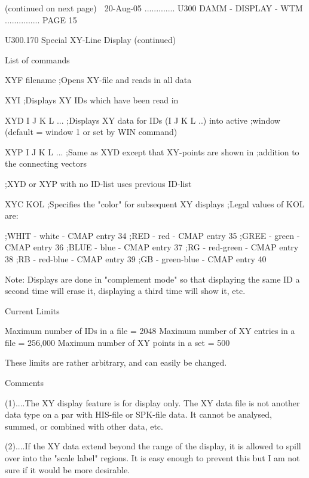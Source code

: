  
 
                            (continued on next page)
    
   20-Aug-05 ............. U300  DAMM - DISPLAY - WTM ............... PAGE  15
 
 
   U300.170  Special XY-Line Display (continued)
 
   List of commands
 
   XYF  filename     ;Opens XY-file and reads in all data
 
   XYI               ;Displays XY IDs which have been read in
 
   XYD  I J K L ...  ;Displays XY data for IDs (I J K L ..) into active
                     ;window (default = window 1 or set by WIN command)
 
   XYP  I J K L ...  ;Same as XYD except that XY-points are shown in
                     ;addition to the connecting vectors
 
                     ;XYD or XYP with no ID-list uses previous ID-list
 
   XYC  KOL          ;Specifies the "color" for subsequent XY displays
                     ;Legal values of KOL are:
 
                     ;WHIT - white      - CMAP entry 34
                     ;RED  - red        - CMAP entry 35
                     ;GREE - green      - CMAP entry 36
                     ;BLUE - blue       - CMAP entry 37
                     ;RG   - red-green  - CMAP entry 38
                     ;RB   - red-blue   - CMAP entry 39
                     ;GB   - green-blue - CMAP entry 40
 
   Note:  Displays  are  done in "complement mode" so that displaying the same
   ID a second time will erase it, displaying a third time will show it, etc.
 
   Current Limits
 
   Maximum number of IDs        in a file = 2048
   Maximum number of XY entries in a file = 256,000
   Maximum number of XY points  in a set  = 500
 
   These limits are rather arbitrary, and can easily be changed.
 
   Comments
 
   (1)....The XY display feature is for display only. The XY data file is  not
          another  data  type  on  a  par  with  HIS-file or SPK-file data. It
          cannot be analysed, summed, or combined with other data, etc.
 
   (2)....If the XY data extend  beyond  the  range  of  the  display,  it  is
          allowed  to  spill  over  into the "scale label" regions. It is easy
          enough to prevent this but I  am  not  sure  if  it  would  be  more
          desirable.
 
